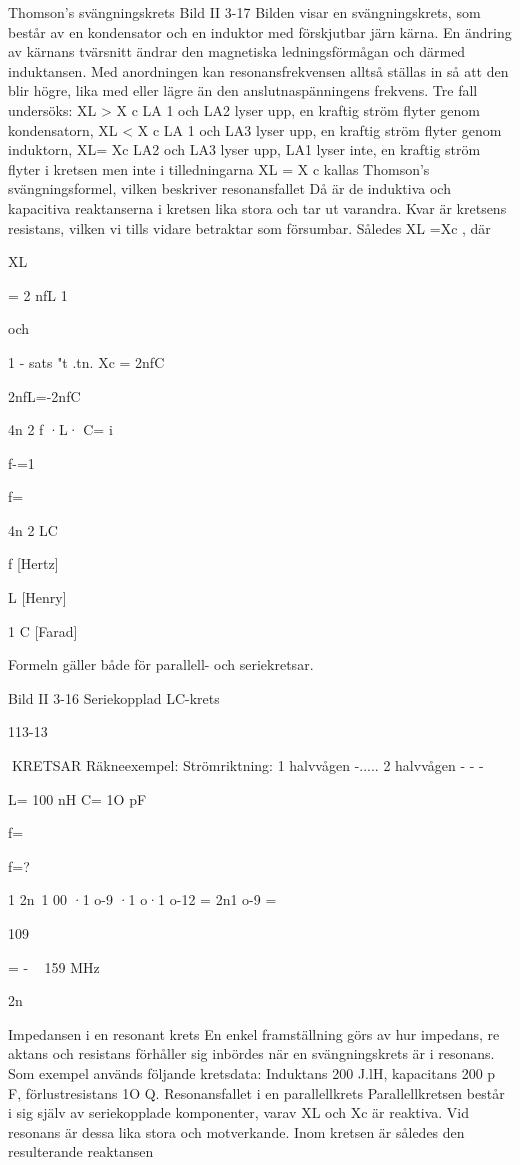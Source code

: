 {Thomson's svängningskrets
Bild II 3-17
Bilden visar en svängningskrets, som består
av en kondensator och en induktor med
förskjutbar järn kärna. En ändring av kärnans
tvärsnitt ändrar den magnetiska ledningsförmågan och därmed induktansen.
Med anordningen kan resonansfrekvensen alltså ställas in så att den blir högre, lika
med eller lägre än den anslutnaspänningens
frekvens. Tre fall undersöks:
XL > X c LA 1 och LA2 lyser upp, en kraftig
ström flyter genom kondensatorn,
XL < X c LA 1 och LA3 lyser upp, en kraftig
ström flyter genom induktorn,
XL= Xc LA2 och LA3 lyser upp, LA1 lyser
inte, en kraftig ström flyter i kretsen
men inte i tilledningarna
XL = X c kallas Thomson's svängningsformel, vilken beskriver resonansfallet
Då är de induktiva och kapacitiva
reaktanserna i kretsen lika stora och tar ut
varandra. Kvar är kretsens resistans, vilken
vi tills vidare betraktar som försumbar.
Således XL =Xc , där

XL

= 2 nfL
1

och

1 - sats
"t .tn.
Xc = 2nfC

2nfL=-2nfC

4n 2 f ·L· C= i

f-=1

f=

4n 2 LC

f [Hertz]

L [Henry]

1
C [Farad]

Formeln gäller både för parallell- och seriekretsar.

Bild II 3-16 Seriekopplad LC-krets

113-13

KRETSAR
Räkneexempel:
Strömriktning: 1 halvvågen -.....
2 halvvågen - - -

L= 100 nH C= 1O pF

f=

f=?

1
2n~1 00 ·1 o-9 ·1 o·1 o-12 = 2n1 o-9 =

109

= - ~ 159 MHz

2n

Impedansen i en resonant krets
En enkel framställning görs av hur impedans, re aktans och resistans förhåller sig
inbördes när en svängningskrets är i resonans. Som exempel används följande
kretsdata: Induktans 200 J.lH, kapacitans
200 p F, förlustresistans 1O Q.
Resonansfallet i en parallellkrets
Parallellkretsen består i sig själv av seriekopplade komponenter, varav XL och Xc
är reaktiva. Vid resonans är dessa lika
stora och motverkande. Inom kretsen är
således den resulterande reaktansen

}
